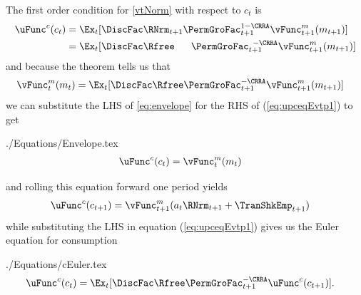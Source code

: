 \documentclass[titlepage, headings=optiontotocandhead]{\econtex}
\providecommand{\interval}{period}\renewcommand{\interval}{period}
\providecommand{\interval}{period}\renewcommand{\interval}{period}
\begin{document}
The first order condition for \eqref{vtNorm} with respect to ${c}_{t}$ is
\begin{equation}\begin{gathered}\begin{aligned}
      \uFunc^{{c}}({c}_{t})  & = \Ex_{t}[\DiscFac \RNrm_{t+1}\PermGroFac_{t+1}^{1-\CRRA}\null{\vFunc}^{{m}}_{t+1}({m}_{t+1})]  \label{eq:upceqEvtp1}
      \\                        & =  \Ex_{t}[\DiscFac\Rfree\phantom{._{t+1}}\PermGroFac_{t+1}^{\phantom{1}-\CRRA}\null{\vFunc}^{{m}}_{t+1}({m}_{t+1})] 
    \end{aligned}\end{gathered}\end{equation}
and because the  theorem tells us that
\begin{equation}\begin{gathered}\begin{aligned}
      \null{\vFunc}^{{m}}_{t}({m}_{t})  & =  \Ex_{t} [\DiscFac\Rfree\PermGroFac_{t+1}^{-\CRRA}\null{\vFunc}^{{m}}_{t+1}({m}_{t+1})] \label{eq:envelope}
    \end{aligned}\end{gathered}\end{equation}
we can substitute the LHS of \eqref{eq:envelope} for the RHS of
(\ref{eq:upceqEvtp1}) to get
\begin{verbatimwrite}{./Equations/Envelope.tex}
  \begin{equation}\begin{gathered}\begin{aligned}
        \uFunc^{{c}}({c}_{t})  & = \null{\vFunc}^{{m}}_{t}({m}_{t})\label{eq:Envelope}
      \end{aligned}\end{gathered}\end{equation}
\end{verbatimwrite}
\unskip
and rolling this equation forward one {\interval} yields
\begin{equation}\begin{gathered}\begin{aligned}
      \uFunc^{{c}}({c}_{t+1})  & = \null{\vFunc}^{{m}}_{t+1}({a}_{t}\RNrm_{t+1}+\TranShkEmp_{t+1}) \label{eq:upctp1EqVpxtp1}
    \end{aligned}\end{gathered}\end{equation}
while substituting the LHS in equation (\ref{eq:upceqEvtp1})
gives us the Euler equation for consumption
\begin{verbatimwrite}{./Equations/cEuler.tex}
  \begin{equation}\begin{gathered}\begin{aligned}
        \uFunc^{{c}}({c}_{t})  & = \Ex_{t}[\DiscFac\Rfree \PermGroFac_{t+1}^{-\CRRA}\uFunc^{{c}}({c}_{t+1})]. \label{eq:cEuler}
                                  \end{aligned}\end{gathered}\end{equation}
\end{verbatimwrite}
\end{document}

